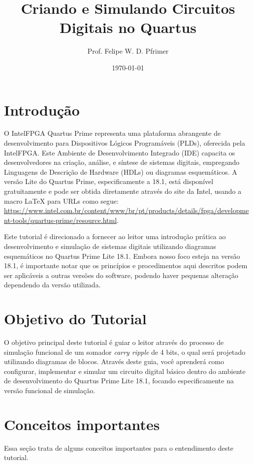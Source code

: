 \documentclass[12pt,a4paper]{article}
\title{\textbf{Criando e Simulando Circuitos Digitais no Quartus}}
\author{Prof. Felipe W. D. Pfrimer}
\date{\today}
\newcommand{\DonwloadUrl}{\url{https://www.intel.com.br/content/www/br/pt/products/details/fpga/development-tools/quartus-prime/resource.html}}
\newcommand{\Version}{18.1}
\begin{document}
\maketitle
\tableofcontents
\newpage

\section{Introdução}

O IntelFPGA Quartus Prime representa uma plataforma abrangente de desenvolvimento para Dispositivos Lógicos Programáveis (PLDs), oferecida pela IntelFPGA. Este Ambiente de Desenvolvimento Integrado (IDE) capacita os desenvolvedores na criação, análise, e síntese de sistemas digitais, empregando Linguagens de Descrição de Hardware (HDLs) ou diagramas esquemáticos. A versão Lite do Quartus Prime, especificamente a \Version, está disponível gratuitamente e pode ser obtida diretamente através do site da Intel, usando a macro LaTeX para URLs como segue: \DonwloadUrl.%

Este tutorial é direcionado a fornecer ao leitor uma introdução prática ao desenvolvimento e simulação de sistemas digitais utilizando diagramas esquemáticos no Quartus Prime Lite \Version. Embora nosso foco esteja na versão \Version, é importante notar que os princípios e procedimentos aqui descritos podem ser aplicáveis a outras versões do software, podendo haver pequenas alteração dependendo da versão utilizada.


\section{Objetivo do Tutorial}

O objetivo principal deste tutorial é guiar o leitor através do processo de simulação funcional de um somador \textit{carry ripple} de 4 bits, o qual será projetado utilizando diagramas de blocos. Através deste guia, você aprenderá como configurar, implementar e simular um circuito digital básico dentro do ambiente de desenvolvimento do Quartus Prime Lite \Version, focando especificamente na versão funcional de simulação.

\section{Conceitos importantes}

Essa seção trata de alguns conceitos importantes para o entendimento deste tutorial.
\end{document}
